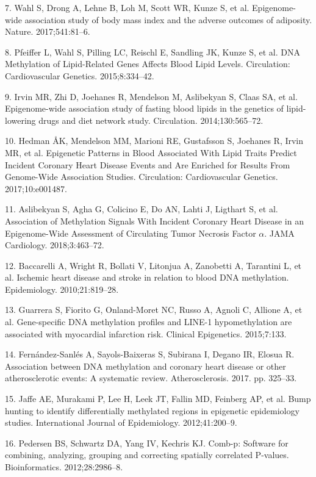 \documentclass[]{bmcart}
\theoremstyle{definition}
\theoremstyle{definition}
\theoremstyle{definition}
\theoremstyle{remark}
\begin{document}
7. Wahl S, Drong A, Lehne B, Loh M, Scott WR, Kunze S, et al.
Epigenome-wide association study of body mass index and the adverse
outcomes of adiposity. Nature. 2017;541:81--6.

8. Pfeiffer L, Wahl S, Pilling LC, Reischl E, Sandling JK, Kunze S, et
al. DNA Methylation of Lipid-Related Genes Affects Blood Lipid Levels.
Circulation: Cardiovascular Genetics. 2015;8:334--42.

9. Irvin MR, Zhi D, Joehanes R, Mendelson M, Aslibekyan S, Claas SA, et
al. Epigenome-wide association study of fasting blood lipids in the
genetics of lipid-lowering drugs and diet network study. Circulation.
2014;130:565--72.

10. Hedman ÅK, Mendelson MM, Marioni RE, Gustafsson S, Joehanes R, Irvin
MR, et al. Epigenetic Patterns in Blood Associated With Lipid Traits
Predict Incident Coronary Heart Disease Events and Are Enriched for
Results From Genome-Wide Association Studies. Circulation:
Cardiovascular Genetics. 2017;10:e001487.

11. Aslibekyan S, Agha G, Colicino E, Do AN, Lahti J, Ligthart S, et al.
Association of Methylation Signals With Incident Coronary Heart Disease
in an Epigenome-Wide Assessment of Circulating Tumor Necrosis Factor
\(\alpha\). JAMA Cardiology. 2018;3:463--72.

12. Baccarelli A, Wright R, Bollati V, Litonjua A, Zanobetti A,
Tarantini L, et al. Ischemic heart disease and stroke in relation to
blood DNA methylation. Epidemiology. 2010;21:819--28.

13. Guarrera S, Fiorito G, Onland-Moret NC, Russo A, Agnoli C, Allione
A, et al. Gene-specific DNA methylation profiles and LINE-1
hypomethylation are associated with myocardial infarction risk. Clinical
Epigenetics. 2015;7:133.

14. Fern{á}ndez-Sanl{é}s A, Sayols-Baixeras S, Subirana I, Degano IR,
Elosua R. Association between DNA methylation and coronary heart disease
or other atherosclerotic events: A systematic review. Atherosclerosis.
2017. pp. 325--33.

15. Jaffe AE, Murakami P, Lee H, Leek JT, Fallin MD, Feinberg AP, et al.
Bump hunting to identify differentially methylated regions in epigenetic
epidemiology studies. International Journal of Epidemiology.
2012;41:200--9.

16. Pedersen BS, Schwartz DA, Yang IV, Kechris KJ. Comb-p: Software for
combining, analyzing, grouping and correcting spatially correlated
P-values. Bioinformatics. 2012;28:2986--8.
\end{document}
